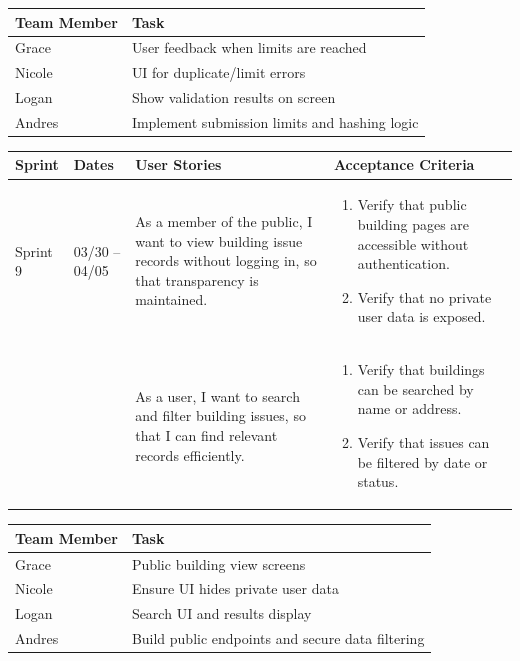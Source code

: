 \documentclass[11pt]{article}
\begin{document}
\vspace{0.5em}

\noindent
\begin{tabular}{|L{2.5cm}|L{12.5cm}|}
\hline
\textbf{Team Member} & \textbf{Task} \\
\hline
Grace & User feedback when limits are reached \\
\hline
Nicole & UI for duplicate/limit errors \\
\hline
Logan & Show validation results on screen \\
\hline
Andres & Implement submission limits and hashing logic \\
\hline
\end{tabular}

\vspace{2em}


\vspace{0.5em}

\noindent
\begin{tabular}{|L{1.2cm}|L{1.8cm}|L{5.2cm}|L{6.3cm}|}
\hline
\textbf{Sprint} & \textbf{Dates} & \textbf{User Stories} & \textbf{Acceptance Criteria} \\
\hline
Sprint 9 & 03/30 -- 04/05 &
As a member of the public, I want to view building issue records without logging in, so that transparency is maintained. &
\begin{enumerate}
    \item Verify that public building pages are accessible without authentication.
    \item Verify that no private user data is exposed.
\end{enumerate} \\
& &
As a user, I want to search and filter building issues, so that I can find relevant records efficiently. &
\begin{enumerate}
    \item Verify that buildings can be searched by name or address.
    \item Verify that issues can be filtered by date or status.
\end{enumerate} \\
\hline
\end{tabular}

\vspace{0.5em}

\noindent
\begin{tabular}{|L{2.5cm}|L{12.5cm}|}
\hline
\textbf{Team Member} & \textbf{Task} \\
\hline
Grace & Public building view screens \\
\hline
Nicole & Ensure UI hides private user data \\
\hline
Logan & Search UI and results display \\
\hline
Andres & Build public endpoints and secure data filtering \\
\hline
\end{tabular}
\end{document}
